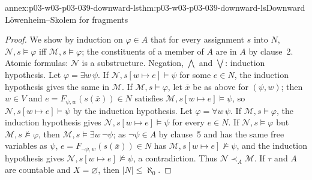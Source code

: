 \begin{annexitem}{annex:p03-w03-p03-039-downward-ls}{thm:p03-w03-p03-039-downward-ls}{Downward L\"owenheim--Skolem for fragments}
\begin{proof}
We show by induction on \(\varphi\in A\) that for every assignment \(s\)
into \(N\), \(\mathcal N,s\models\varphi\) iff \(\mathcal M,s\models\varphi\);
the constituents of a member of \(A\) are in \(A\) by clause~2. Atomic
formulas: \(\mathcal N\) is a substructure. Negation, \(\bigwedge\) and
\(\bigvee\): induction hypothesis. Let \(\varphi=\exists w\,\psi\). If
\(\mathcal N,s[w\mapsto e]\models\psi\) for some \(e\in N\), the induction
hypothesis gives the same in \(\mathcal M\). If \(\mathcal M,s\models\varphi\),
let \(\bar x\) be as above for \((\psi,w)\); then \(w\in V\) and
\(e=F_{\psi,w}(s(\bar x))\in N\) satisfies
\(\mathcal M,s[w\mapsto e]\models\psi\), so
\(\mathcal N,s[w\mapsto e]\models\psi\) by the induction hypothesis. Let
\(\varphi=\forall w\,\psi\). If \(\mathcal M,s\models\varphi\), the
induction hypothesis gives \(\mathcal N,s[w\mapsto e]\models\psi\) for every
\(e\in N\). If \(\mathcal N,s\models\varphi\) but
\(\mathcal M,s\not\models\varphi\), then
\(\mathcal M,s\models\exists w\,\neg\psi\); as \(\neg\psi\in A\) by
clause~5 and has the same free variables as \(\psi\),
\(e=F_{\neg\psi,w}(s(\bar x))\in N\) has
\(\mathcal M,s[w\mapsto e]\not\models\psi\), and the induction hypothesis
gives \(\mathcal N,s[w\mapsto e]\not\models\psi\), a contradiction. Thus
\(\mathcal N\prec_A\mathcal M\). If \(\tau\) and \(A\) are countable and
\(X=\varnothing\), then \(\lvert N\rvert\le\aleph_0\).
\end{proof}
\end{annexitem}

